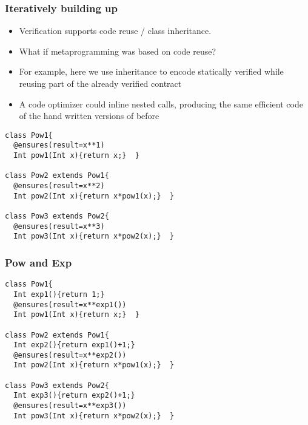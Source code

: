 \begin{frame}[fragile]
\frametitle{Iteratively building up \Q@pow@}
\vspace{-2ex}
\begin{itemize}
\item Verification supports code reuse / class inheritance.
\item What if metaprogramming was based on code reuse?
\item For example, here we use inheritance to encode statically verified
\Q@pow@s while reusing part of the already verified contract
\item \tiny{A code optimizer could inline nested calls, producing 
the same efficient code of the hand written versions of before}
\end{itemize}

\begin{Scaled}{0.95}{0.95}
\begin{lstlisting}
class Pow1{
  @ensures(result=x**1)
  Int pow1(Int x){return x;}  }

class Pow2 extends Pow1{
  @ensures(result=x**2)
  Int pow2(Int x){return x*pow1(x);}  }

class Pow3 extends Pow2{
  @ensures(result=x**3)
  Int pow3(Int x){return x*pow2(x);}  }
\end{lstlisting}
\end{Scaled}
\end{frame}



\begin{frame}[fragile]
\frametitle{Pow and Exp}
\vspace{-4ex}
\begin{Scaled}{0.95}{0.95}
\begin{lstlisting}
class Pow1{
  Int exp1(){return 1;}
  @ensures(result=x**exp1())
  Int pow1(Int x){return x;}  }

class Pow2 extends Pow1{
  Int exp2(){return exp1()+1;}
  @ensures(result=x**exp2())
  Int pow2(Int x){return x*pow1(x);}  }

class Pow3 extends Pow2{
  Int exp3(){return exp2()+1;}
  @ensures(result=x**exp3())
  Int pow3(Int x){return x*pow2(x);}  }
\end{lstlisting}
\end{Scaled}
\end{frame}


